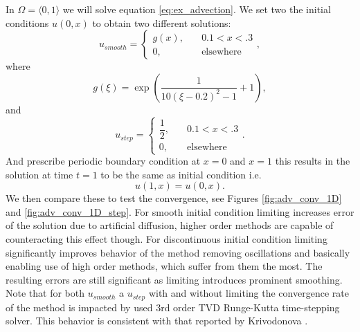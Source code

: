 \begin{example}[Advection 1D]
\label{ex:adv1D}
In $\Omega = \langle 0, 1 \rangle$ we will solve equation \eqref{eq:ex_advection}.
We set two the initial conditions $u(0, x)$ to obtain two different solutions:
\begin{equation}
u_{smooth} = \begin{cases}
g(x),\quad &0.1 < x < .3\\
0, \quad &\text{elsewhere}
\end{cases},
\end{equation}
where
\begin{equation}
g(\xi) = \exp\left(\frac{1}{10(\xi - 0.2)^2 - 1}+ 1\right),
\end{equation}
and
\begin{equation}
u_{step} = \begin{cases}
\dfrac{1}{2},\quad &0.1 < x < .3\\
0, \quad &\text{elsewhere}
\end{cases}.
\end{equation}
And prescribe periodic boundary condition at $x = 0 $ and $x = 1$  this 
results in the solution at time $t = 1$ to be the same as initial condition 
i.e.
\begin{equation}
u(1, x) = u(0, x).
\end{equation} 
We then compare these to test the convergence, see Figures 
\ref{fig:adv_conv_1D} and \ref{fig:adv_conv_1D_step}. For smooth initial condition 
limiting increases error of the solution due to artificial diffusion, higher order 
methods are capable of counteracting this effect though. For discontinuous initial 
condition limiting significantly improves behavior of the method removing oscillations 
and basically enabling use of high order methods, which suffer from them the most. The 
resulting errors are still significant as limiting introduces prominent 
smoothing. Note that for both $u_{smooth}$ a $u_{step}$ with and without limiting the 
convergence rate of the method is impacted by used 3rd order TVD Runge-Kutta 
time-stepping solver. This behavior is consistent with that reported by Krivodonova 
\cite{Krivodonova2007}.

\end{example}
